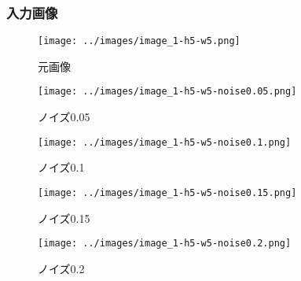\documentclass{ltjsarticle}
\begin{document}
\subsubsection{入力画像}
\begin{figure}[h]
  \centering
  \begin{minipage}[b]{0.18\columnwidth}
      \centering
      \texttt{[image: ../images/image\_1-h5-w5.png]}
      \caption{元画像}
  \end{minipage}
  \begin{minipage}[b]{0.18\columnwidth}
      \centering
      \texttt{[image: ../images/image\_1-h5-w5-noise0.05.png]}
      \caption{ノイズ0.05}
  \end{minipage}
  \begin{minipage}[b]{0.18\columnwidth}
      \centering
      \texttt{[image: ../images/image\_1-h5-w5-noise0.1.png]}
      \caption{ノイズ0.1}
  \end{minipage}
  \begin{minipage}[b]{0.18\columnwidth}
      \centering
      \texttt{[image: ../images/image\_1-h5-w5-noise0.15.png]}
      \caption{ノイズ0.15}
  \end{minipage}
  \begin{minipage}[b]{0.18\columnwidth}
      \centering
      \texttt{[image: ../images/image\_1-h5-w5-noise0.2.png]}
      \caption{ノイズ0.2}
  \end{minipage}
\end{figure}
\end{document}
